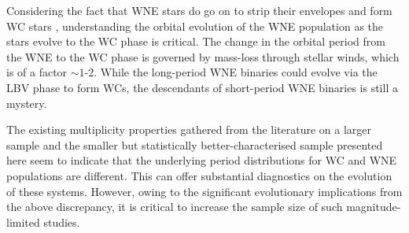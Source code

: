 

Considering the fact that WNE stars do go on to strip their envelopes and form WC stars \citep{2003MeynetMaeder}, understanding the orbital evolution of the WNE population as the stars evolve to the WC phase is critical. The change in the orbital period from the WNE to the WC phase is governed by mass-loss through stellar winds, which is of a factor ${\sim}1$-2. While the long-period WNE binaries could evolve via the LBV phase to form WCs, the descendants of short-period WNE binaries is still a mystery.

The existing multiplicity properties gathered from the literature on a larger sample and the smaller but statistically better-characterised sample presented here seem to indicate that the underlying period distributions for WC and WNE populations are different. This can offer substantial diagnostics on the evolution of these systems. However, owing to the significant evolutionary implications from the above discrepancy, it is critical to increase the sample size of such magnitude-limited studies.
